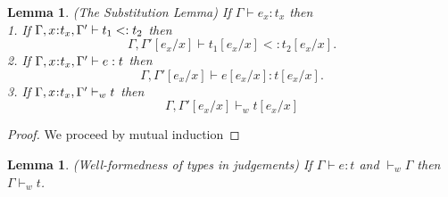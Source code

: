 \documentclass[11pt]{article}
\newtheorem{lemma}[theorem]{Lemma}
\newcommand{\bind}{\hspace{0.05em}{:}\hspace{0.05em}} %
\begin{document}


\begin{lemma}(The Substitution Lemma) If $\Gamma \vdash e_x : t_x$ then\\
1. If $\Gamma, x\bind t_x, \Gamma' \vdash t_1 <: t_2$ then
\[
\Gamma, \Gamma'[e_x/x] \vdash t_1[e_x/x] <: t_2[e_x/x].
\]
2. If $\Gamma, x\bind t_x, \Gamma' \vdash e : t$ then
\[
\Gamma, \Gamma'[e_x/x] \vdash e[e_x/x] : t[e_x/x].
\]
3. If $\Gamma, x\bind t_x, \Gamma' \vdash_w t$ then
\[
\Gamma, \Gamma'[e_x/x] \vdash_w t[e_x/x]
\]
\end{lemma}

\begin{proof}
We proceed by mutual induction 	
	
	
	
	
\end{proof}

\begin{lemma}\label{types-wf}
(Well-formedness of types in judgements) 
If $\Gamma \vdash e: t$ and $\vdash_{w} \Gamma$ then $\Gamma \vdash_w t$.
\end{lemma}
\end{document}
